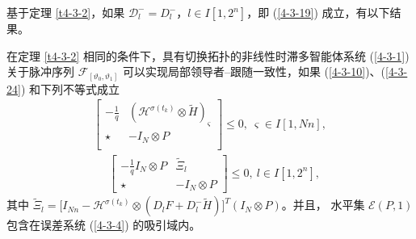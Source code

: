 基于定理 \ref{t4-3-2}，如果 $\mathscr{D}^-_l=D^-_l$，$l\in I[1,2^n]$，即 (\ref{4-3-19}) 成立，有以下结果。 
\begin{corollary}\label{c4-3-2}
    在定理 \ref{t4-3-2} 相同的条件下，具有切换拓扑的非线性时滞多智能体系统 (\ref{4-3-1}) 关于脉冲序列 $\mathscr{F}_{[\vartheta_0,\vartheta_1]}$ 可以实现局部领导者--跟随一致性，如果 (\ref{4-3-10})、(\ref{4-3-24}) 和下列不等式成立 
    \begin{align}\label{4-3-25} 
    \left[ \begin{array}{cc}
    -\frac{1}{q}&  (\mathcal{H}^{\sigma(t_k)}\otimes \tilde{H})_\varsigma \\
    \star&-I_N\otimes P  \\
    \end{array}
    \right]\leq 0,\ \varsigma\in I[1,Nn ],
    \end{align} 
    \begin{align} \label{4-3-26} 
    &\left[ \begin{array}{cc}
    -\frac{1}{q}I_N\otimes P& \tilde{\varXi}_{l} \\
    \star&-I_N\otimes P
    \end{array}
    \right]\leq0,\ l\in I[1,2^n],
    \end{align}
    其中 
    $
    \tilde{\varXi}_{l}=[I_{Nn}- \mathcal{H}^{\sigma(t_k)} \otimes (D_{l}F+D_{l}^-\tilde{H})\big]^T(I_N\otimes P)  
    $。并且，
    水平集 $ \mathscr{E} ( P,1)$ 包含在误差系统 (\ref{4-3-4}) 的吸引域内。
\end{corollary} 
